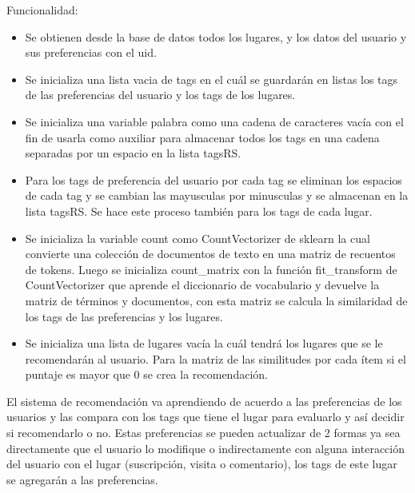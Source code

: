 \documentclass[12pt,letterpaper,openany]{book}
\begin{document}
Funcionalidad:
\begin{itemize}
    \item Se obtienen desde la base de datos todos los lugares, y los datos del usuario y sus preferencias con el uid.
    \item Se inicializa una lista vacia de tags en el cuál se guardarán en listas los tags de las preferencias del usuario y los tags de los lugares.
    \item Se inicializa una variable palabra como una cadena de caracteres vacía con el fin de usarla como auxiliar para almacenar todos los tags en una cadena separadas por un espacio en la lista tagsRS.
    \item Para los tags de preferencia del usuario por cada tag se eliminan los espacios de cada tag y se cambian las mayusculas por minusculas y se almacenan en la lista tagsRS. Se hace este proceso también para los tags de cada lugar.
    \item Se inicializa la variable count como CountVectorizer de sklearn la cual convierte una colección de documentos de texto en una matriz de recuentos de tokens. Luego se inicializa count\_matrix con la función fit\_transform de CountVectorizer que aprende el diccionario de vocabulario y devuelve la matriz de términos y documentos, con esta matriz se calcula la similaridad de los tags de las preferencias y los lugares.
    \item Se inicializa una lista de lugares vacía la cuál tendrá los lugares que se le recomendarán al usuario. Para la matriz de las similitudes por cada ítem si el puntaje es mayor que 0 se crea la recomendación.
\end{itemize}

El sistema de recomendación va aprendiendo de acuerdo a las preferencias de los usuarios y las compara con los tags que tiene el lugar para evaluarlo y así decidir si recomendarlo o no.
Estas preferencias se pueden actualizar de 2 formas ya sea directamente que el usuario lo modifique o indirectamente con alguna interacción del usuario con el lugar (suscripción, visita o comentario), los tags de este lugar se agregarán a las preferencias.
\end{document}
